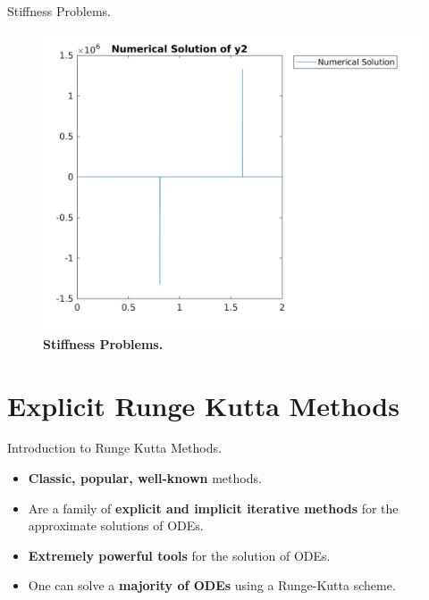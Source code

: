 \documentclass[9pt]{beamer}
\numberwithin{equation}{section}
\begin{document}
\begin{frame}{Stiffness Problems.}
\begin{figure}
\centering 
\includegraphics[scale=0.15]{ats_vdp_y2}
\caption{\textbf{\textsf{Stiffness Problems.}}}
\end{figure}
\end{frame}

\section{Explicit Runge Kutta Methods}
\begin{frame}{Introduction to Runge Kutta Methods.}
\begin{itemize}
\item \textbf{Classic, popular, well-known} methods.
\item Are a family of \textbf{explicit and implicit iterative methods} for the approximate solutions of ODEs.
\item \textbf{Extremely powerful tools} for the solution of ODEs.
\item One can solve a \textbf{majority of ODEs} using a Runge-Kutta scheme.
\end{itemize}
\end{frame}
\end{document}
